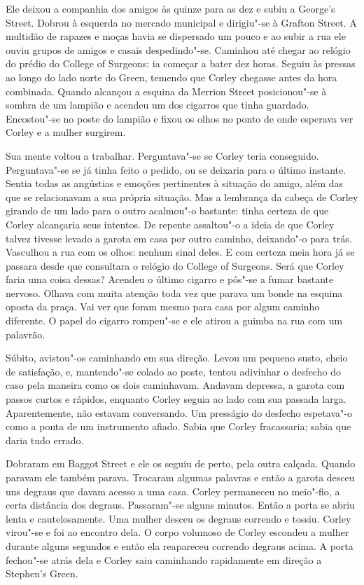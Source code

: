 Ele deixou a companhia dos amigos às quinze para as dez e subiu a George’s
Street.  Dobrou à esquerda no mercado municipal e dirigiu"-se à Grafton Street.
A multidão de rapazes e moças havia se dispersado um pouco e ao subir a rua ele
ouviu grupos de amigos e casais despedindo"-se.  Caminhou até chegar ao relógio
do prédio do College of Surgeons: ia começar a bater dez horas.  Seguiu às
pressas ao longo do lado norte do Green, temendo que Corley chegasse antes da
hora combinada.  Quando alcançou a esquina da Merrion Street posicionou"-se à
sombra de um lampião e acendeu um dos cigarros que tinha guardado.  Encostou"-se
no poste do lampião e fixou os olhos no ponto de onde esperava ver Corley e a
mulher surgirem.

Sua mente voltou a trabalhar.  Perguntava"-se se Corley teria conseguido.
Perguntava"-se se já tinha feito o pedido, ou se deixaria para o último
instante.  Sentia todas as angústias e emoções pertinentes à situação do amigo,
além das que se relacionavam a sua própria situação.  Mas a lembrança da cabeça
de Corley girando de um lado para o outro acalmou"-o bastante: tinha certeza de
que Corley alcançaria seus intentos.  De repente assaltou"-o a ideia de que
Corley talvez tivesse levado a garota em casa por outro caminho, deixando"-o
para trás.  Vasculhou a rua com os olhos: nenhum sinal deles.  E com certeza
meia hora já se passara desde que consultara o relógio do College of Surgeons.
Será que Corley faria uma coisa dessas?  Acendeu o último cigarro e pôs"-se a
fumar bastante nervoso.  Olhava com muita atenção toda vez que parava um bonde
na esquina oposta da praça.  Vai ver que foram mesmo para casa por algum
caminho diferente.  O papel do cigarro rompeu"-se e ele atirou a guimba na rua
com um palavrão.

Súbito, avistou"-os caminhando em sua direção.  Levou um pequeno susto, cheio de
satisfação, e, mantendo"-se colado ao poste, tentou adivinhar o desfecho do caso
pela maneira como os dois caminhavam.  Andavam depressa, a garota com passos
curtos e rápidos, enquanto Corley seguia ao lado com sua passada larga.
Aparentemente, não estavam conversando.  Um presságio do desfecho espetava"-o
como a ponta de um instrumento afiado.  Sabia que Corley fracassaria; sabia que
daria tudo errado.

Dobraram em Baggot Street e ele os seguiu de perto, pela outra calçada.  Quando
paravam ele também parava.  Trocaram algumas palavras e então a garota desceu
uns degraus que davam acesso a uma casa.  Corley permaneceu no meio"-fio, a
certa distância dos degraus.  Passaram"-se alguns minutos.  Então a porta se
abriu lenta e cautelosamente.  Uma mulher desceu os degraus correndo e tossiu.
Corley virou"-se e foi ao encontro dela.  O corpo volumoso de Corley escondeu a
mulher durante alguns segundos e então ela reapareceu correndo degraus acima.
A porta fechou"-se atrás dela e Corley saiu caminhando rapidamente em direção a
Stephen’s Green.

